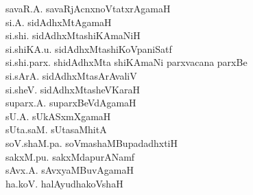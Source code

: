 {\begin{multicols}{2}
\begin{tabbing}
savaR.A. \> savaRjAcnxnoVtatxrAgamaH\\[2pt]
si.A. \> sidAdhxMtAgamaH\\[2pt]
si.shi. \> sidAdhxMtashiKAmaNiH\\[2pt]
si.shiKA.u. \> sidAdhxMtashiKoVpaniSatf\\[2pt]
si.shi.parx. \> shidAdhxMta shiKAmaNi parxvacana parxBe\\[2pt]
si.sArA. \> sidAdhxMtasArAvaliV\\[2pt]
si.sheV. \> sidAdhxMtasheVKaraH\\[2pt]
suparx.A. \> suparxBeVdAgamaH\\[2pt]
sU.A. \> sUkASxmXgamaH\\[2pt]
sUta.saM. \> sUtasaMhitA\\[2pt]
soV.shaM.pa. \> soVmashaMBupadadhxtiH\\[2pt]
sakxM.pu. \> sakxMdapurANamf\\[2pt]
sAvx.A. \> sAvxyaMBuvAgamaH\\[2pt]
ha.koV. \> halAyudhakoVshaH
\end{tabbing}
\end{multicols}
}
